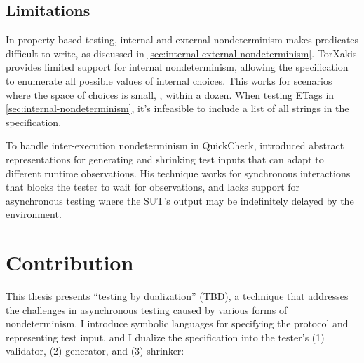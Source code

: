 \subsection{Limitations}
In property-based testing, internal and external nondeterminism makes predicates
difficult to write, as discussed
in \autoref{sec:internal-external-nondeterminism}.  TorXakis provides limited
support for internal nondeterminism, allowing the specification to enumerate all
possible values of internal choices.  This works for scenarios where the space
of choices is small, \eg, within a dozen.  When testing ETags
in \autoref{sec:internal-nondeterminism}, it's infeasible to include a list of
all strings in the specification.

To handle inter-execution nondeterminism in QuickCheck, \citet{Hughes2016}
introduced abstract representations for generating and shrinking test inputs
that can adapt to different runtime observations.  His technique works for
synchronous interactions that blocks the tester to wait for observations, and
lacks support for asynchronous testing where the SUT's output may be
indefinitely delayed by the environment.

\section{Contribution}
\label{sec:contribution}
This thesis presents ``testing by dualization'' (TBD), a technique that
addresses the challenges in asynchronous testing caused by various forms of
nondeterminism.  I introduce symbolic languages for specifying the protocol and
representing test input, and I dualize the specification into the tester's (1)
validator, (2) generator, and (3) shrinker:


